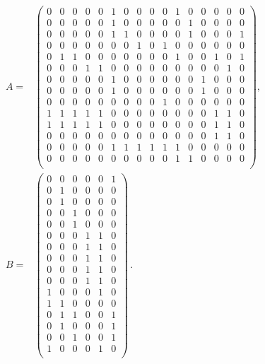 \begin{equation}\label{eq:matrix_ab}
    \begin{split}
    A = &\begin{pmatrix}
        0 & 0 & 0 & 0 & 0 & 1 & 0 & 0 & 0 & 0 & 1 & 0 & 0 & 0 & 0 & 0 \\
        0 & 0 & 0 & 0 & 0 & 1 & 0 & 0 & 0 & 0 & 0 & 1 & 0 & 0 & 0 & 0 \\
        0 & 0 & 0 & 0 & 0 & 1 & 1 & 0 & 0 & 0 & 0 & 1 & 0 & 0 & 0 & 1 \\
        0 & 0 & 0 & 0 & 0 & 0 & 0 & 1 & 0 & 1 & 0 & 0 & 0 & 0 & 0 & 0 \\
        0 & 1 & 1 & 0 & 0 & 0 & 0 & 0 & 0 & 0 & 1 & 0 & 0 & 1 & 0 & 1 \\
        0 & 0 & 0 & 1 & 1 & 0 & 0 & 0 & 0 & 0 & 0 & 0 & 0 & 0 & 1 & 0 \\
        0 & 0 & 0 & 0 & 0 & 1 & 0 & 0 & 0 & 0 & 0 & 0 & 1 & 0 & 0 & 0 \\
        0 & 0 & 0 & 0 & 0 & 1 & 0 & 0 & 0 & 0 & 0 & 0 & 1 & 0 & 0 & 0 \\
        0 & 0 & 0 & 0 & 0 & 0 & 0 & 0 & 0 & 1 & 0 & 0 & 0 & 0 & 0 & 0 \\
        1 & 1 & 1 & 1 & 1 & 0 & 0 & 0 & 0 & 0 & 0 & 0 & 0 & 1 & 1 & 0 \\
        1 & 1 & 1 & 1 & 1 & 0 & 0 & 0 & 0 & 0 & 0 & 0 & 0 & 1 & 1 & 0 \\
        0 & 0 & 0 & 0 & 0 & 0 & 0 & 0 & 0 & 0 & 0 & 0 & 0 & 1 & 1 & 0 \\
        0 & 0 & 0 & 0 & 0 & 1 & 1 & 1 & 1 & 1 & 1 & 0 & 0 & 0 & 0 & 0 \\
        0 & 0 & 0 & 0 & 0 & 0 & 0 & 0 & 0 & 0 & 1 & 1 & 0 & 0 & 0 & 0 \\
    \end{pmatrix},{}\\
%
    B = &\begin{pmatrix}
        0 & 0 & 0 & 0 & 0 & 1 \\
        0 & 1 & 0 & 0 & 0 & 0 \\
        0 & 1 & 0 & 0 & 0 & 0 \\
        0 & 0 & 1 & 0 & 0 & 0 \\
        0 & 0 & 1 & 0 & 0 & 0 \\
        0 & 0 & 0 & 1 & 1 & 0 \\
        0 & 0 & 0 & 1 & 1 & 0 \\
        0 & 0 & 0 & 1 & 1 & 0 \\
        0 & 0 & 0 & 1 & 1 & 0 \\
        0 & 0 & 0 & 1 & 1 & 0 \\
        1 & 0 & 0 & 0 & 1 & 0 \\
        1 & 1 & 0 & 0 & 0 & 0 \\
        0 & 1 & 1 & 0 & 0 & 1 \\
        0 & 1 & 0 & 0 & 0 & 1 \\
        0 & 0 & 1 & 0 & 0 & 1 \\
        1 & 0 & 0 & 0 & 1 & 0 \\
    \end{pmatrix}\,.
\end{split}
\end{equation}

